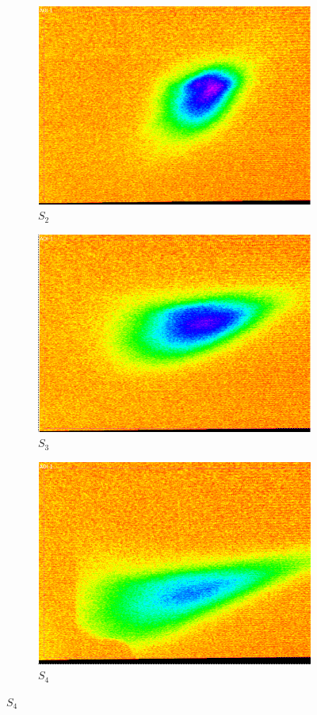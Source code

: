 \documentclass[12pt]{article}
\begin{document}
\begin{figure}[H]
\begin{subfigure}{0.16\textwidth}
    \includegraphics[width=\linewidth]{fig/S2.png}
    \caption{$S_2$}
  \end{subfigure}%
  \hfill
  \begin{subfigure}{0.16\textwidth}
    \includegraphics[width=\linewidth]{fig/S3.png}
    \caption{$S_3$}
  \end{subfigure}%
  \hfill
  \begin{subfigure}{0.16\textwidth}
    \includegraphics[width=\linewidth]{fig/S4.png}
    \caption{$S_4$}
  \end{subfigure}
 

\end{figure}
\end{document}
